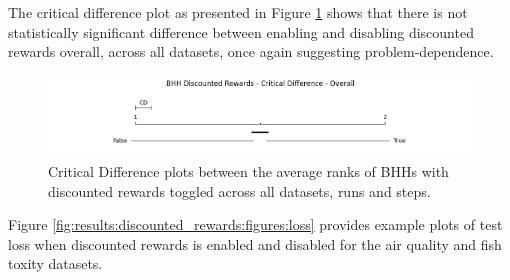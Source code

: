 The critical difference plot as presented in Figure \ref{fig:results:discounted_rewards:descriptive:cd} shows that there is not statistically significant difference between enabling and disabling discounted rewards overall, across all datasets, once again suggesting problem-dependence.

\begin{figure}[htbp]
	\centering
	\includegraphics[width=\textwidth]{analysis/bhh_discounted_rewards/figures/cd/overall.png}
	\caption{Critical Difference plots between the average ranks of \Acsp{BHH} with discounted rewards toggled across all datasets, runs and steps.}
	\label{fig:results:discounted_rewards:descriptive:cd}
\end{figure}

Figure \ref{fig:results:discounted_rewards:figures:loss} provides example plots of test loss when discounted rewards is enabled and disabled for the air quality and fish toxity datasets. 



